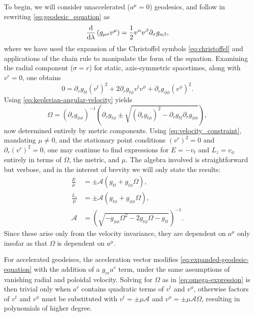 To begin, we will consider unaccelerated ($a^\mu = 0$) geodesics, and follow \cite{johannsen_regular_2013} in rewriting \eqref{eq:geodesic_equation} as
\begin{equation}
    \frac{\text{d}}{\text{d} \lambda}\left( g_{\mu\sigma}v^\mu \right) = \frac{1}{2} v^\alpha v^\beta \partial_\sigma g_{\alpha \beta},
\end{equation}
where we have used the expansion of the Christoffel symbols \eqref{eq:christoffel} and applications of the chain rule to manipulate the form of the equation. Examining the radial component ($\sigma = r$) for static, axis-symmetric spacetimes, along with $v^r = 0$, one obtains
\begin{equation}
    \label{eq:expanded-geodesic-equation}
    0 = 
    \partial_r g_{tt} (v^t)^2
    + 2\partial_r g_{t\phi} v^t v^\phi
    + \partial_r g_{\phi\phi} (v^\phi)^2.
\end{equation}
Using \eqref{eq:keplerian-angular-velocity} yields
\begin{equation}
    \label{eq:omega-expression}
    \Omega = 
    \left( \partial_r g_{\phi\phi} \right)^{-1}\left( \partial_r g_{t\phi} \pm \sqrt{\left( \partial_r g_{t\phi} \right)^2 - \partial_r g_{tt} \partial_r g_{\phi\phi}} \right),
\end{equation}
now determined entirely by metric components. Using \eqref{eq:velocity_constraint}, mandating $\mu \neq 0$, and the stationary point conditions $(v^r)^2 = 0$ and $\partial_r (v^r)^2 = 0$, one may continue to find expressions for $E = -v_t$ and $L_z = v_\phi$ entirely in terms of $\Omega$, the metric, and $\mu$. The algebra involved is straightforward but verbose, and in the interest of brevity we will only state the results:
\begin{align}
    \frac{E}{\mu} &= \pm \mathcal{A} \left(g_{tt} + g_{t\phi}\Omega\right) , \\
    \frac{L_z}{\mu} &= \pm \mathcal{A} \left(g_{t\phi} + g_{\phi\phi}\Omega\right), \\
    \mathcal{A} &= \left(\sqrt{-g_{\phi\phi} \Omega^2 - 2g_{t\phi} \Omega - g_{tt}}\right)^{-1}.
\end{align}
Since these arise only from the velocity invariance, they are dependent on $a^\mu$ only insofar as that $\Omega$ is dependent on $a^\mu$.

For accelerated geodeiscs, the acceleration vector modifies \eqref{eq:expanded-geodesic-equation} with the addition of a $g_{rr} a^r$ term, under the same assumptions of vanishing radial and poloidal velocity. Solving for $\Omega$ as in \eqref{eq:omega-expression} is then trivial only when $a^r$ contains quadratic terms of $v^t$ and $v^\phi$, otherwise factors of $v^t$ and $v^\phi$ must be substituted with $v^t = \pm \mu \mathcal{A}$ and $v^\phi = \pm \mu \mathcal{A} \Omega$, resulting in polynomials of higher degree.

